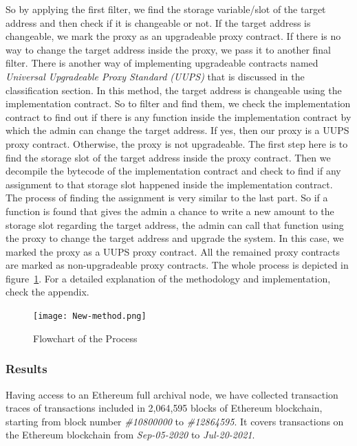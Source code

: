 So by applying the first filter, we find the storage variable/slot of the target address and then check if it is changeable or not. If the target address is changeable, we mark the proxy as an upgradeable proxy contract.
If there is no way to change the target address inside the proxy, we pass it to another final filter. There is another way of implementing upgradeable contracts named \textit{Universal Upgradeable Proxy Standard (UUPS)} that is discussed in the classification section. In this method, the target address is changeable using the implementation contract. So to filter and find them, we check the implementation contract to find out if there is any function inside the implementation contract by which the admin can change the target address. If yes, then our proxy is a UUPS proxy contract. Otherwise, the proxy is not upgradeable. The first step here is to find the storage slot of the target address inside the proxy contract. Then we decompile the bytecode of the implementation contract and check to find if any assignment to that storage slot happened inside the implementation contract. The process of finding the assignment is very similar to the last part. So if a function is found that gives the admin a chance to write a new amount to the storage slot regarding the target address, the admin can call that function using the proxy to change the target address and upgrade the system. In this case, we marked the proxy as a UUPS proxy contract.
All the remained proxy contracts are marked as non-upgradeable proxy contracts. The whole process is depicted in figure~\ref{flowchart}. For a detailed explanation of the methodology and implementation, check the appendix.

\begin{figure}[t!]
  \texttt{[image: New-method.png]}\label{flowchart}
  \caption{Flowchart of the Process}
\end{figure}



\subsubsection{Results}

Having access to an Ethereum full archival node, we have collected transaction traces of transactions included in 2,064,595 blocks of Ethereum blockchain, starting from block number \textit{\#10800000} to \textit{\#12864595}. It covers transactions on the Ethereum blockchain from \textit{Sep-05-2020} to \textit{Jul-20-2021}. 

